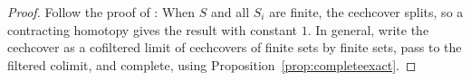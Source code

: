 \begin{proof}
Follow the proof of \cite[Theorem 3.3]{Condensed}: When $S$ and all $S_i$ are finite, the cechcover splits, so a contracting homotopy gives the result with constant $1$. In general, write the cechcover as a cofiltered limit of cechcovers of finite sets by finite sets, pass to the filtered colimit, and complete, using Proposition~\ref{prop:completeexact}.
\end{proof}


